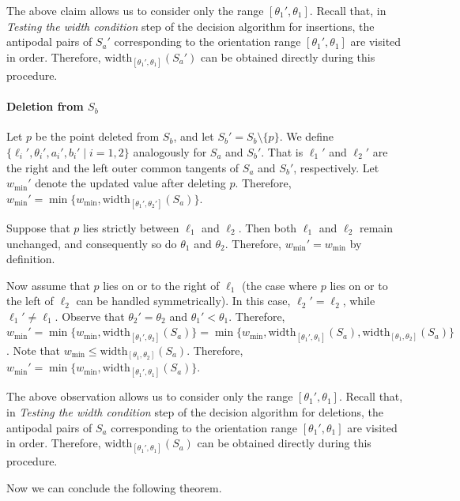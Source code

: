 \documentclass[10pt,a4paper]{article}
\theoremstyle{star}
\theoremstyle{claimstar}
\newcommand{\width}{\ensuremath{\mathrm{width}}}
\begin{document}
The above claim allows us to consider only the range $[\theta_1', \theta_1]$. 
Recall that, in \emph{Testing the width condition} step of the decision algorithm for insertions, the antipodal pairs of $S_a'$ corresponding to the orientation range $[\theta_1', \theta_1]$ are visited in order.
Therefore, $\width_{[\theta_1', \theta_1]}(S_a')$ can be obtained directly during this procedure.




\paragraph*{Deletion from $S_b$}
Let $p$ be the point deleted from $S_b$, and let $S_b' = S_b \setminus \{p\}$.
We define $\{\ell_i', \theta_i', a_i', b_i' \mid i=1, 2 \}$ analogously for $S_a$ and $S_b'$. 
That is $\ell_1'$ and $\ell_2'$ are the right and the left outer common tangents of $S_a$ and $S_b'$, respectively. 
Let $w_{\min}'$ denote the updated value after deleting $p$.
Therefore, $w_{\min}' = \min \{w_{\min}, \width_{[\theta_1', \theta_2']}(S_a)\}$.


Suppose that $p$ lies strictly between $\ell_1$ and $\ell_2$. 
Then both $\ell_1$ and $\ell_2$ remain unchanged, and consequently so do $\theta_1$ and $\theta_2$.
Therefore, $w_{\min}' = w_{\min}$ by definition. 



Now assume that $p$ lies on or to the right of $\ell_1$ (the case where $p$ lies on or to the left of $\ell_2$ can be handled symmetrically).
In this case, $\ell_2' = \ell_2$, while $\ell_1' \neq \ell_1$.
Observe that $\theta_2' = \theta_2$ and $\theta_1' < \theta_1$.
Therefore, $w_{\min}' = \min \{w_{\min}, \width_{[\theta_1', \theta_2]}(S_a)\} =  \min \{w_{\min}, \width_{[\theta_1', \theta_1]}(S_a), \width_{[\theta_1, \theta_2]}(S_a)\}$.
Note that $w_{\min} \le \width_{[\theta_1, \theta_2]}(S_a) $. 
Therefore, $w_{\min}' = \min \{w_{\min}, \width_{[\theta_1', \theta_1]}(S_a) \}$.


The above observation allows us to consider only the range $[\theta_1', \theta_1]$. 
Recall that, in \emph{Testing the width condition} step of the decision algorithm for deletions, the antipodal pairs of $S_a$ corresponding to the orientation range $[\theta_1', \theta_1]$ are visited in order.
Therefore, $\width_{[\theta_1', \theta_1]}(S_a)$ can be obtained directly during this procedure.

Now we can conclude the following theorem. 
\end{document}
